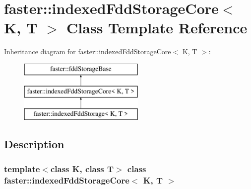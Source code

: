 \hypertarget{classfaster_1_1indexedFddStorageCore}{}\section{faster\+:\+:indexed\+Fdd\+Storage\+Core$<$ K, T $>$ Class Template Reference}
\label{classfaster_1_1indexedFddStorageCore}
Inheritance diagram for faster\+:\+:indexed\+Fdd\+Storage\+Core$<$ K, T $>$\+:\begin{figure}[H]
\begin{center}
\leavevmode
\includegraphics[height=3.000000cm]{classfaster_1_1indexedFddStorageCore}
\end{center}
\end{figure}


\subsection{Description}
\subsubsection*{template$<$class K, class T$>$\newline
class faster\+::indexed\+Fdd\+Storage\+Core$<$ K, T $>$}

